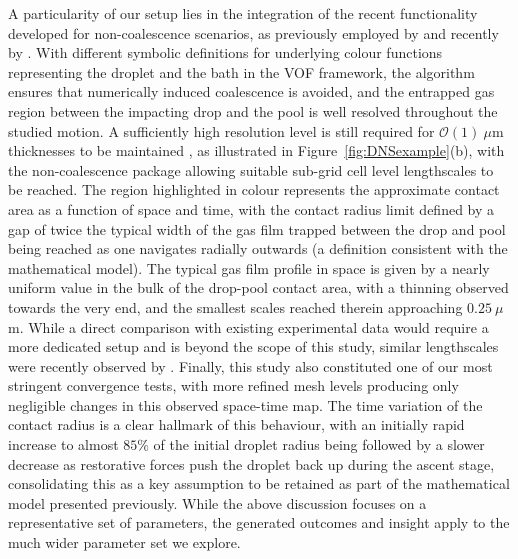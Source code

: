 \documentclass{jfm}
\begin{document}
A particularity of our setup lies in the integration of the recent functionality developed for non-coalescence scenarios, as previously employed by \cite{ramirez2020lifting} and recently by \cite{sanjay2022taylor}. With different symbolic definitions for underlying colour functions representing the droplet and the bath in the VOF framework, the algorithm ensures that numerically induced coalescence is avoided, and the entrapped gas region between the impacting drop and the pool is well resolved throughout the studied motion. A sufficiently high resolution level is still required for $\mathcal{O}(1)\ \mu\textrm{m}$ thicknesses to be maintained \citep{tang2019bouncing}, as illustrated in Figure~\ref{fig:DNSexample}(b), with the non-coalescence package allowing suitable sub-grid cell level lengthscales to be reached. The region highlighted in colour represents the approximate contact area as a function of space and time, with the contact radius limit defined by a gap of twice the typical width of the gas film trapped between the drop and pool being reached as one navigates radially outwards (a definition consistent with the mathematical model). The typical gas film profile in space is given by a nearly uniform value in the bulk of the drop-pool contact area, with a thinning observed towards the very end, and the smallest scales reached therein approaching $0.25\ \mu$m. While a direct comparison with existing experimental data would require a more dedicated setup and is beyond the scope of this study, similar lengthscales were recently observed by \citet{tang2019bouncing}. Finally, this study also constituted one of our most stringent convergence tests, with more refined mesh levels producing only negligible changes in this observed space-time map. The time variation of the contact radius is a clear hallmark of this behaviour, with an initially rapid increase to almost $85\%$ of the initial droplet radius being followed by a slower decrease as restorative forces push the droplet back up during the ascent stage, consolidating this as a key assumption to be retained as part of the mathematical model presented previously. While the above discussion focuses on a representative set of parameters, the generated outcomes and insight apply to the much wider parameter set we explore.
\end{document}

